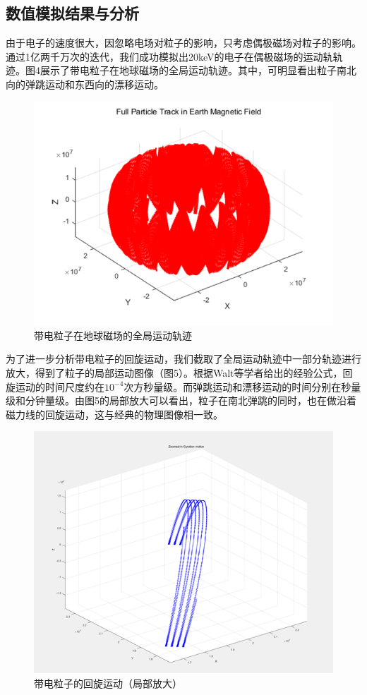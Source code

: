 \documentclass[11pt]{article}
\begin{document}
\clearpage

\subsection{数值模拟结果与分析}
由于电子的速度很大，因忽略电场对粒子的影响，只考虑偶极磁场对粒子的影响。通过1亿两千万次的迭代，我们成功模拟出20keV的电子在偶极磁场的运动轨轨迹。图4展示了带电粒子在地球磁场的全局运动轨迹。其中，可明显看出粒子南北向的弹跳运动和东西向的漂移运动。

\begin{figure}[h]
    \centering
    \includegraphics[width=0.75\linewidth]{Fig/fulltrack.png}
    \caption{带电粒子在地球磁场的全局运动轨迹}
    \label{fig:4}
\end{figure}


为了进一步分析带电粒子的回旋运动，我们截取了全局运动轨迹中一部分轨迹进行放大，得到了粒子的局部运动图像（图5）。根据Walt等学者给出的经验公式，回旋运动的时间尺度约在${10}^{-4}$次方秒量级。而弹跳运动和漂移运动的时间分别在秒量级和分钟量级。由图5的局部放大可以看出，粒子在南北弹跳的同时，也在做沿着磁力线的回旋运动，这与经典的物理图像相一致。

\begin{figure}[h]
    \centering
    \includegraphics[width=0.5\linewidth]{Fig/zoompart.png}
    \caption{带电粒子的回旋运动（局部放大）}
    \label{fig:5}
\end{figure}
\end{document}
